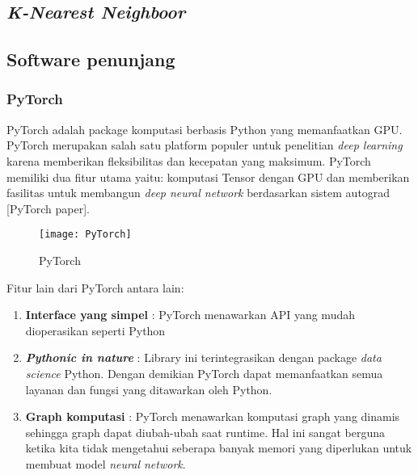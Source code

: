 \documentclass[../thesis.tex]{subfiles}
\begin{document}
\subsection{\textit{K-Nearest Neighboor}}

\subsection{Software penunjang}
\subsubsection{PyTorch}
PyTorch adalah package komputasi berbasis Python yang memanfaatkan GPU. PyTorch merupakan salah satu platform populer untuk penelitian \textit{deep learning} karena memberikan fleksibilitas dan kecepatan yang maksimum.
PyTorch memiliki dua fitur utama yaitu: komputasi Tensor dengan GPU dan memberikan fasilitas untuk membangun \textit{deep neural network} berdasarkan sistem autograd [PyTorch paper]. 
\begin{figure}[htp]
	\centering
	\texttt{[image: PyTorch]}
	\caption{PyTorch}
	\label{PyTorch}
\end{figure}


Fitur lain dari PyTorch antara lain:
\begin{enumerate}
	\item \textbf{Interface yang simpel} : PyTorch menawarkan API yang mudah dioperasikan seperti Python
	\item \textbf{\textit{Pythonic in nature}} : Library ini terintegrasikan dengan package \textit{data science} Python. Dengan demikian PyTorch dapat memanfaatkan semua layanan dan fungsi yang ditawarkan oleh Python.
	\item \textbf{Graph komputasi} : PyTorch menawarkan komputasi graph yang dinamis sehingga graph dapat diubah-ubah saat runtime. Hal ini sangat berguna ketika kita tidak mengetahui seberapa banyak memori yang diperlukan untuk membuat model \textit{neural network}.
\end{enumerate}
\end{document}
